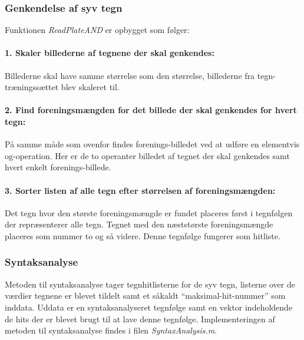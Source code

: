 
\subsubsection*{Genkendelse af syv tegn}

Funktionen \textit{ReadPlateAND} er opbygget som følger:

\paragraph{1. Skaler billederne af tegnene der skal genkendes:} Billederne skal have samme størrelse som den størrelse, billederne fra tegn-træningssættet blev skaleret til.

\paragraph{2. Find foreningsmængden for det billede der skal genkendes for hvert tegn:} På samme måde som ovenfor findes forenings-billedet ved at udføre en elementvis og-operation. Her er de to operanter billedet af tegnet der skal genkendes samt hvert enkelt forenings-billede.

\paragraph{3. Sorter listen af alle tegn efter størrelsen af foreningsmængden:} Det tegn hvor den største foreningsmængde er fundet placeres først i tegnfølgen der repræsenterer alle tegn. Tegnet med den næststørste foreningsmængde placeres som nummer to og så videre. Denne tegnfølge fungerer som hitliste.

\subsubsection{Syntaksanalyse}

Metoden til syntaksanalyse tager tegnhitlisterne for de syv tegn, listerne over de værdier tegnene er blevet tildelt samt et såkaldt ``maksimal-hit-nummer'' som inddata. Uddata er en syntaksanalyseret tegnfølge samt en vektor indeholdende de hits der er blevet brugt til at lave denne tegnfølge. Implementeringen af metoden til syntaksanalyse findes i filen \textit{SyntaxAnalysis.m}.

